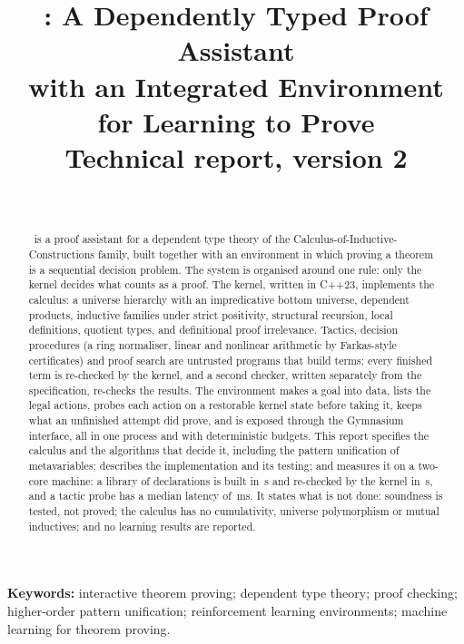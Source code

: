 \title{\textbf{\ITP: A Dependently Typed Proof Assistant\\ with an Integrated Environment for Learning to Prove}\\[0.4em]
\large Technical report, version 2}
\author{\authorname\\ \small \authoraffil}
\date{}
\maketitle
{}

\begin{abstract}
\noindent
\ITP\ is a proof assistant for a dependent type theory of the Calculus-of-Inductive-Constructions family, built together with an environment in which proving a theorem is a sequential decision problem.
The system is organised around one rule: only the kernel decides what counts as a proof.
The kernel, written in C++23, implements the calculus: a universe hierarchy with an impredicative bottom universe, dependent products, inductive families under strict positivity, structural recursion, local definitions, quotient types, and definitional proof irrelevance.
Tactics, decision procedures (a ring normaliser, linear and nonlinear arithmetic by Farkas-style certificates) and proof search are untrusted programs that build terms; every finished term is re-checked by the kernel, and a second checker, written separately from the specification, re-checks the results.
The environment makes a goal into data, lists the legal actions, probes each action on a restorable kernel state before taking it, keeps what an unfinished attempt did prove, and is exposed through the Gymnasium interface, all in one process and with deterministic budgets.
This report specifies the calculus and the algorithms that decide it, including the pattern unification of metavariables; describes the implementation and its testing; and measures it on a two-core machine: a library of \libGlobals{} declarations is built in \libBuildA\,s and re-checked by the kernel in \kerRecheckA\,s, and a tactic probe has a median latency of \probeMed\,ms.
It states what is not done: soundness is tested, not proved; the calculus has no cumulativity, universe polymorphism or mutual inductives; and no learning results are reported.
\end{abstract}

\noindent\textbf{Keywords:} interactive theorem proving; dependent type theory; proof checking; higher-order pattern unification; reinforcement learning environments; machine learning for theorem proving.

\vspace{0.6em}
\setcounter{tocdepth}{2}
{\small\tableofcontents}
\clearpage
